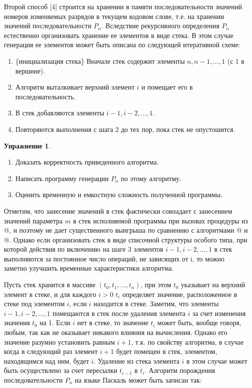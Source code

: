 \documentclass[12pt,a4paper]{article}
\theoremstyle{plain}
\theoremstyle{definition}
\newtheorem*{task}{Упражнение}
\theoremstyle{remark}
\begin{document}
Второй способ [4] строится на хранении в памяти последовательности значений номеров изменяемых разрядов в текущем кодовом слове, т.е. на хранении значений последовательности $P_n$. Вследствие рекурсивного определения $P_n$ естественно организовать хранение ее элементов в виде стека. В этом случае генерация ее элементов может быть описана по следующей итеративной схеме:

\begin{enumerate}
\item \{инициализация стека\} Вначале стек содержит элементы $n,n-1,\ldots,1$ (с 1 в вершине).
\item Алгоритм выталкивает верхний элемент $i$ и помещает его в последовательность.
\item В стек добавляются элементы $i-1,i-2,\ldots,1$.
\item Повторяются выполнения с шага 2 до тех пор, пока стек не опустошится.
\end{enumerate}

\begin{task}
~\\
\begin{enumerate}
\item Доказать корректность приведенного алгоритма.
\item Написать программу генерации $P_n$ по этому алгоритму.
\item Оценить временную и емкостную сложность полученной программы.
\end{enumerate}
\end{task}

Отметим, что занесение значений в стек фактически совпадает с занесением значений параметра $m$ в стек исполняемой программы при вызовах процедуры \verb@GRAY@ из @, и поэтому не дает существенного выигрыша по сравнению с алгоритмами @ и @. Однако если организовать стек в виде списочной структуры особого типа, при которой действия по включению на шаге 3 элементов $i-1,i-2,\ldots,1$ в стек выполняются за постоянное число операций, не зависящих от i, то можно заметно улучшить временные характеристики алгоритма.

Пусть стек хранится в массиве $(t_0,t_1,\ldots,t_n)$, при этом $t_0$ указывает на верхний элемент в стеке, и для каждого $i>0$ $t_i$ определяет значение, расположенное в стеке под элементом $i$, если $i$ находится в стеке. Заметим, что элементы $i-1,i-2,\ldots,1$ помещаются в стек после удаления элемента $i$ за счет изменения значения $t_0$ на 1. Если $i$ нет в стеке, то значение $t_i$ может быть, вообще говоря, любым, так как не оказывает никакого влияния на вычисления. Однако его значение разумно установить равным $i+1$, т.к. по свойству алгоритма, в случае когда в следующий раз элемент $i+1$ будет помещен в стек, элементом, находящимся над ним, будет $i$. Удаление из стека элемента $i$ в этом случае может быть осуществлено за счет пересылки $t_{i-1}$ в $t_i$. Алгоритм порождения последовательности $P_n$ на языке Паскаль может быть записан так:
\end{document}
